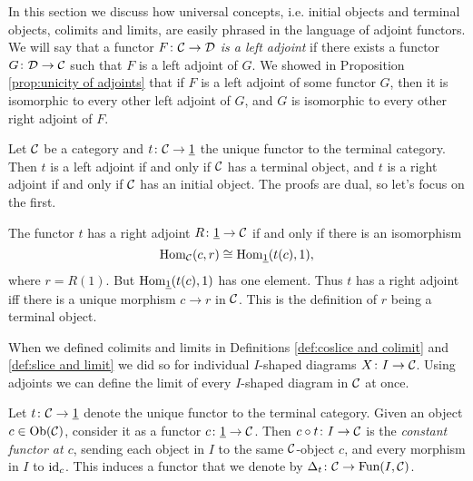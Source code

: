 \documentclass[CT4S-EN-RU]{subfiles}
\begin{document}
\begin{blockENG}
In this section we discuss how universal concepts, i.e. initial objects and terminal objects, colimits and limits, are easily phrased in the language of adjoint functors. We will say that a functor $F\colon\mathcal{C}\rightarrow\mathcal{D}$ {\em is a left adjoint} if there exists a functor $G\colon\mathcal{D}\rightarrow\mathcal{C}$ such that $F$ is a left adjoint of $G$. We showed in Proposition \ref{prop:unicity of adjoints} that if $F$ is a left adjoint of some functor $G$, then it is isomorphic to every other left adjoint of $G$, and $G$ is isomorphic to every other right adjoint of $F$.
\end{blockENG}

\begin{blockRUS}
\end{blockRUS}

\begin{exampleENG}
Let $\mathcal{C}$ be a category and $t\colon\mathcal{C}\rightarrow\underline{1}$ the unique functor to the terminal category. Then $t$ is a left adjoint if and only if $\mathcal{C}$ has a terminal object, and $t$ is a right adjoint if and only if $\mathcal{C}$ has an initial object. The proofs are dual, so let's focus on the first.

The functor $t$ has a right adjoint $R\colon\underline{1}\rightarrow\mathcal{C}$ if and only if there is an isomorphism $$\textnormal{Hom}_\mathcal{C}(c,r)\cong\textnormal{Hom}_{\underline{1}}(t(c),1),$$ where $r=R(1)$. But $\textnormal{Hom}_{\underline{1}}(t(c),1)$ has one element. Thus $t$ has a right adjoint iff there is a unique morphism $c\to r$ in $\mathcal{C}$. This is the definition of $r$ being a terminal object.
\end{exampleENG}

\begin{exampleRUS}
\end{exampleRUS}

\begin{blockENG}
When we defined colimits and limits in Definitions \ref{def:coslice and colimit} and \ref{def:slice and limit} we did so for individual $I$-shaped diagrams $X\colon I\rightarrow\mathcal{C}$. Using adjoints we can define the limit of every $I$-shaped diagram in $\mathcal{C}$ at once.
\end{blockENG}

\begin{blockRUS}
\end{blockRUS}

\begin{blockENG}
Let $t\colon\mathcal{C}\rightarrow\underline{1}$ denote the unique functor to the terminal category. Given an object $c\in\textnormal{Ob}(\mathcal{C})$, consider it as a functor $c\colon\underline{1}\rightarrow\mathcal{C}$. Then $c\circ t\colon I\rightarrow\mathcal{C}$ is the {\em constant functor at $c$}, sending each object in $I$ to the same $\mathcal{C}$-object $c$, and every morphism in $I$ to $\textnormal{id}_c$. This induces a functor that we denote by $\Delta_t\colon\mathcal{C}\rightarrow\textnormal{Fun}(I,\mathcal{C})$.
\end{blockENG}
\end{document}
